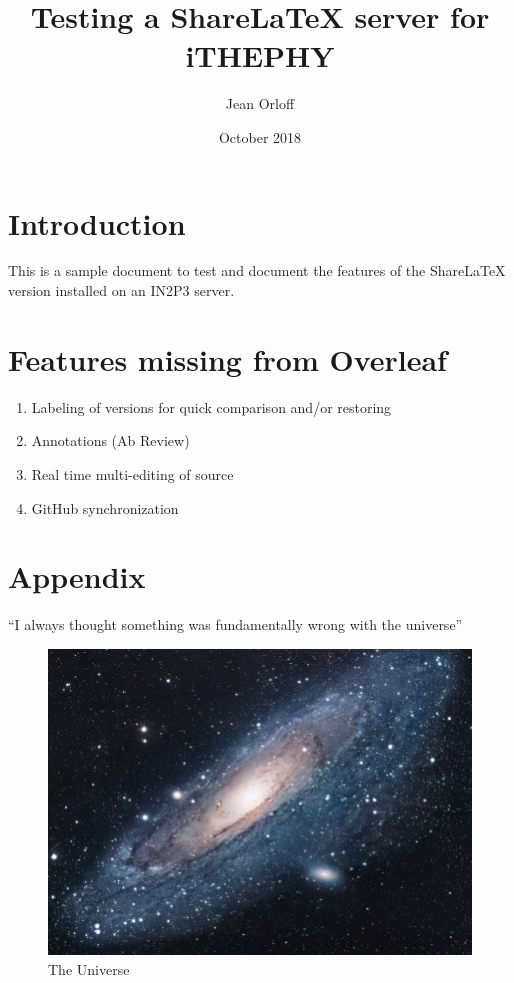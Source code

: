\documentclass{article}
\title{Testing a ShareLaTeX server for iTHEPHY}
\author{Jean Orloff}
\date{October 2018}
\begin{document}
\maketitle

\section{Introduction}
This is a sample document to test and document the features of the ShareLaTeX version installed on an IN2P3 server.

\section{Features missing from Overleaf}
\begin{enumerate}
    \item Labeling of versions for quick comparison and/or restoring  
    \item Annotations (Ab Review)
    \item Real time multi-editing of source
    \item GitHub synchronization
\end{enumerate}



\section{Appendix}
``I always thought something was fundamentally wrong with the universe'' \citep{adams1995hitchhiker}
\begin{figure}[h!]
\centering
\includegraphics[scale=1.7]{universe}
\caption{The Universe}
\label{fig:universe}
\end{figure}




\end{document}
